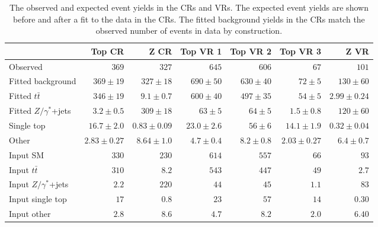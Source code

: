 \begin{table}[ht]
  \caption{The observed and expected event yields in the CRs and VRs. The
    expected event yields are shown before and after a fit to the data in
    the CRs. The fitted background yields in the CRs match the observed
    number of events in data by construction.
  }
  \label{tab:bkg_only_fit_results}
  \begin{center}
    \begin{tabular}{lrrrrrr}
      \toprule
                                  & Top CR           & Z CR            & Top VR 1       & Top VR 2      & Top VR 3        & Z VR            \\
      \midrule
      Observed                    & $369$            & $327$           & $645$          & $606$         & $67$            & $101$           \\
      \midrule
      Fitted background           & $369   \pm 19$   & $327  \pm 18$   & $690  \pm 50$  & $630 \pm 40$  & $72   \pm 5$    & $130  \pm 60$   \\
      \midrule
      Fitted $t\bar{t}$           & $346   \pm 19$   & $9.1  \pm 0.7$  & $600  \pm 40$  & $497 \pm 35$  & $54   \pm 5$    & $2.99 \pm 0.24$ \\
      Fitted $Z/\gamma^{*}$+jets  & $3.2   \pm 0.5$  & $309  \pm 18$   & $63   \pm 5$   & $64  \pm 5$   & $1.5  \pm 0.8$  & $120  \pm 60$   \\
      Single top                  & $16.7  \pm 2.0$  & $0.83 \pm 0.09$ & $23.0 \pm 2.6$ & $56  \pm 6$   & $14.1 \pm 1.9$  & $0.32 \pm 0.04$ \\
      Other                       & $2.83  \pm 0.27$ & $8.64 \pm 1.0$  & $4.7  \pm 0.4$ & $8.2 \pm 0.8$ & $2.03 \pm 0.27$ & $6.4  \pm 0.7$  \\
      \midrule
      Input SM                  & $330$            & $230$           & $614$          & $557$         & $66$            & $93$            \\
      \midrule
      Input $t\bar{t}$          & $310$            & $8.2$           & $543$          & $447$         & $49$            & $2.7$           \\
      Input $Z/\gamma^{*}$+jets & $2.2$            & $220$           & $44$           & $45$          & $1.1$           & $83$            \\
      Input single top          & $17$             & $0.8$           & $23$           & $57$          & $14$            & $0.30$          \\
      Input other               & $2.8$            & $8.6$           & $4.7$          & $8.2$         & $2.0$           & $6.40$          \\
      \bottomrule
    \end{tabular}
  \end{center}
\end{table}


